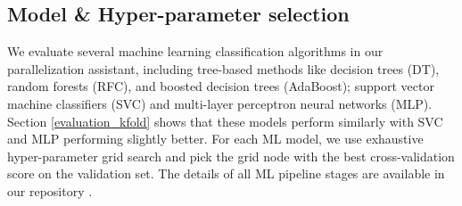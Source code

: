 \subsection{Model \& Hyper-parameter selection}
\label{model_selection}
\quad We evaluate several machine learning classification algorithms in our parallelization assistant, including tree-based methods like decision trees (DT), random forests (RFC), and boosted decision trees (AdaBoost); support vector machine classifiers (SVC) and multi-layer perceptron neural networks (MLP). Section \ref{evaluation_kfold} shows that these models perform similarly with SVC and MLP performing slightly better. For each ML model, we use exhaustive hyper-parameter grid search and pick the grid node with the best cross-validation score on the validation set. The details of all ML pipeline stages are available in our repository \cite{assistant-repo}.
